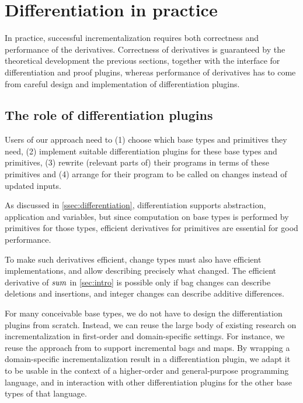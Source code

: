 \chapter{Differentiation in practice}
\label{sec:applying}

In practice, successful incrementalization requires both
correctness and performance of the derivatives. Correctness of
derivatives is guaranteed by the theoretical development the
previous sections, together with the interface for
differentiation and proof plugins, whereas performance of
derivatives has to come from careful design and implementation of
differentiation plugins.

\section{The role of differentiation plugins}
\label{ssec:methodology}
Users of our approach need to
%
(1) choose which base types and primitives they need,
%
(2) implement suitable differentiation plugins for these base
types and primitives,
%
(3) rewrite (relevant parts of) their programs in terms of these primitives and
%
(4) arrange for their program to be called on changes instead of
updated inputs.

As discussed in \cref{ssec:differentiation}, differentiation
supports abstraction, application and variables, but since
computation on base types is performed by primitives for those
types, efficient derivatives for primitives are essential for
good performance.

To make such derivatives efficient, change
types must also have efficient implementations, and allow
describing precisely what changed. The efficient derivative of
$\mathit{sum}$ in \cref{sec:intro} is possible only if bag changes
can describe deletions and insertions, and integer changes can
describe additive differences.

For many conceivable base types, we do not have to design the
differentiation plugins from scratch. Instead, we can reuse the
large body of existing research on incrementalization in
first-order and domain-specific settings. For instance, we reuse
the approach from \citet{GlucheGrust97Incr} to support incremental
bags and maps. By wrapping a
domain-specific incrementalization result in a differentiation
plugin, we adapt it to be usable in the context of a higher-order
and general-purpose programming language, and in interaction with
other differentiation plugins for the other base types of that
language.

